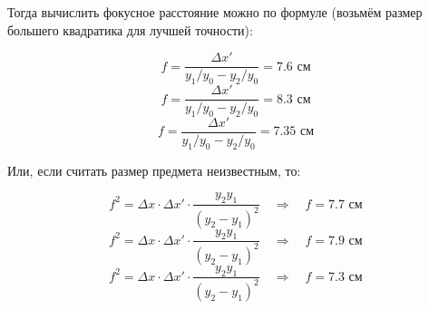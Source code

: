 \documentclass[a4paper,12pt]{article}
\theoremstyle{definition}
\begin{document}
Тогда вычислить фокусное расстояние можно по формуле (возьмём размер большего квадратика для лучшей точности):

\begin{equation*}
    f = \frac{\Delta x'}{y_1/y_0 - y_2/y_0} = 7.6 \text{ см}
\end{equation*}
\begin{equation*}
    f = \frac{\Delta x'}{y_1/y_0 - y_2/y_0} = 8.3 \text{ см}
\end{equation*}
\begin{equation*}
    f = \frac{\Delta x'}{y_1/y_0 - y_2/y_0} = 7.35 \text{ см}
\end{equation*}

Или, если считать размер предмета неизвестным, то:

\begin{equation*}
    f^2 = \Delta x \cdot \Delta x' \cdot \frac{y_2y_1}{(y_2-y_1)^2} \quad \Rightarrow \quad f = 7.7 \text{ см}
\end{equation*}
\begin{equation*}
    f^2 = \Delta x \cdot \Delta x' \cdot \frac{y_2y_1}{(y_2-y_1)^2} \quad \Rightarrow \quad f = 7.9 \text{ см}
\end{equation*}
\begin{equation*}
    f^2 = \Delta x \cdot \Delta x' \cdot \frac{y_2y_1}{(y_2-y_1)^2} \quad \Rightarrow \quad f = 7.3 \text{ см}
\end{equation*}
\end{document}
